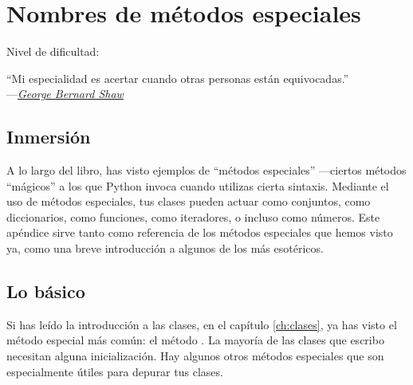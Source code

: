 
\chapter{Nombres de métodos especiales}\label{ch:metesp}

\noindent Nivel de dificultad:\diflllll

\begin{citaCap}
    ``Mi especialidad es acertar cuando otras personas están equivocadas.'' \\
        ---\emph{\href{https://en.wikiquote.org/wiki/George\_Bernard\_Shaw}{George Bernard Shaw}}
\end{citaCap}

\section{Inmersión}

A lo largo del libro, has visto ejemplos de ``métodos especiales'' ---ciertos métodos ``mágicos'' a los que Python invoca cuando utilizas cierta sintaxis. Mediante el uso de métodos especiales, tus clases pueden actuar como conjuntos, como diccionarios, como funciones, como iteradores, o incluso como números. Este apéndice sirve tanto como referencia de los métodos especiales que hemos visto ya, como una breve introducción a algunos de los más esotéricos.

\section{Lo básico}

Si has leído la introducción a las clases, en el capítulo \ref{ch:clases}, ya has visto el método especial más común: el método . La mayoría de las clases que escribo necesitan alguna inicialización. Hay algunos otros métodos especiales que son especialmente útiles para depurar tus clases.

